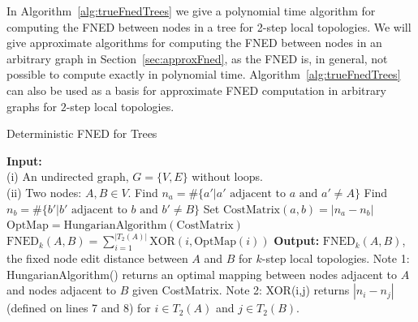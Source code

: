 \documentclass{article}
\begin{document}
In Algorithm~\ref{alg:trueFnedTrees} we give a polynomial time algorithm for computing the FNED between nodes in a tree for 2-step local topologies. We will give approximate algorithms for computing the FNED between nodes in an arbitrary graph in Section~\ref{sec:approxFned}, as the FNED is, in general, not possible to compute exactly in polynomial time. Algorithm~\ref{alg:trueFnedTrees} can also be used as a basis for approximate FNED computation in arbitrary graphs for $2$-step local topologies.
\begin{algorithm}[h!tbp]
\caption{Deterministic FNED for Trees}
\label{alg:trueFnedTrees}
\begin{algorithmic}[1]
\STATE \textbf{Input:} \\(i) An undirected graph, $G = \{V,E\}$ without loops.\\(ii) Two nodes: $A, B \in V$.
\STATE Find $n_{a} = \# \{ a' | a' \text{ adjacent to } a \text{ and } a' \neq A \}$
\STATE Find $n_{b} = \# \{ b' | b' \text{ adjacent to } b \text{ and } b' \neq B \}$
\STATE Set $\text{CostMatrix}(a,b) = | n_{a} - n_{b} |$
\ENDFOR
\ENDFOR
\STATE $\text{OptMap}=\text{HungarianAlgorithm}(\text{CostMatrix})$
\STATE $\text{FNED}_{k}(A,B) = \sum_{i=1}^{|T_{2}(A)|} \text{XOR}(i,\text{OptMap}(i))$
\STATE \textbf{Output:} $\text{FNED}_{k}(A,B)$, the fixed node edit distance between $A$ and $B$ for $k$-step local topologies.
\STATE Note 1: HungarianAlgorithm() returns an optimal mapping between nodes adjacent to $A$ and nodes adjacent to $B$ given CostMatrix.
\STATE Note 2: XOR(i,j) returns $|n_{i} - n_{j}|$ (defined on lines 7 and 8) for $i \in T_{2}(A)$ and $j \in T_{2}(B)$.
\end{algorithmic}
\end{algorithm}
\end{document}
